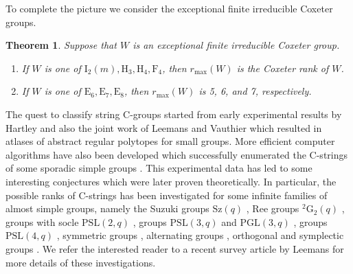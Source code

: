 \documentclass{amsart}
\numberwithin{equation}{section}
\theoremstyle{plain} %
\newtheorem{theorem}{Theorem}[section]
\begin{document}
To complete the picture we consider the exceptional finite irreducible Coxeter groups.


\begin{theorem}\label{exceptional} Suppose that $W$ is an exceptional finite irreducible Coxeter group.
\begin{enumerate}


\item[(i)] If $W$ is one of $\mathrm{I}_2(m), \mathrm{H}_3, \mathrm{H}_4, \mathrm{F}_4$, then $r_{\mathrm{max}}(W)$ is the Coxeter rank of $W$.
\item[(ii)] If $W$ is one of $\mathrm{E}_6, \mathrm{E}_7, \mathrm{E}_8$, then $r_{\mathrm{max}}(W)$ is 5, 6, and 7, respectively.

\end{enumerate}

\end{theorem}



 

The quest to classify string C-groups started from early experimental results by Hartley \cite{p29} and also the joint work of Leemans and Vauthier \cite{p42} which resulted in atlases of abstract regular polytopes for small groups. More efficient computer algorithms have also been developed which successfully enumerated the C-strings of some sporadic simple groups \cite{p30,p37,p38}. This experimental data has led to some interesting conjectures which were later proven theoretically. In particular, the possible ranks of C-strings has been investigated for some infinite families of almost simple groups, namely the Suzuki groups $\mathrm{Sz}(q)$ \cite{p36}, Ree groups ${}^{2}\mathrm{G}_2(q)$ \cite{p41}, groups with socle $\mathrm{PSL}(2,q)$ \cite{p14,p39,p40},  groups $\mathrm{PSL}(3,q)$ and $\mathrm{PGL}(3,q)$ \cite{p5}, groups $\mathrm{PSL}(4,q)$ \cite{p3}, symmetric groups \cite{p20}, alternating groups \cite{altrank,p22}, orthogonal and symplectic groups \cite{p2,newpaper}. We refer the interested reader to a recent survey article by Leemans \cite{arpsurvey} for more details of these investigations.
\end{document}
